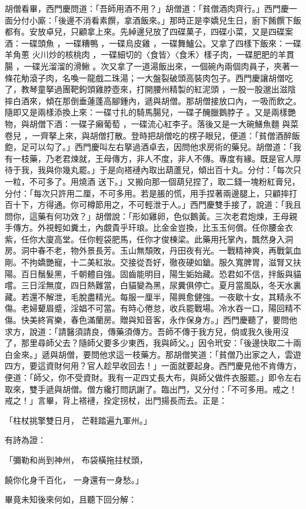\begin{showcontents}{}
胡僧看畢，西門慶問道：「吾師用酒不用？」胡僧道：「貧僧酒肉齊行。」西門慶一面分付小廝：「後邊不消看素饌，拿酒飯來。」那時正是李嬌兒生日，廚下餚饌下飯都有。安放卓兒，只顧拿上來。先綽邊兒放了四碟菓子，四碟小菜，又是四碟案酒：一碟頭魚 ，一碟糟鴨 ，一碟烏皮雞 ，一碟舞鱸公。又拿了四樣下飯來：一碟羊角蔥 火川炒的核桃肉 ，一碟細切的〈食皆〉〈食禾〉樣子肉，一碟肥肥的羊貫腸 ，一碟光溜溜的滑鰍 。次又拿了一道湯飯出來，一個碗內兩個肉員子，夾著一條花觔滾子肉，名喚一龍戲二珠湯；一大盤裂破頭高裝肉包子。西門慶讓胡僧吃了，教琴童拏過團靶鉤頭雞脖壺來，打開腰州精製的紅泥頭 ，一股一股邈出滋陰摔白酒來，傾在那倒垂蓮蓬高腳鍾內，遞與胡僧。那胡僧接放口內，一吸而飲之。隨即又是兩樣添換上來：一碟寸扎的騎馬腸兒，一碟子醃臘鵝脖子 。又是兩樣艷物，與胡僧下酒：一碟子癩葡萄 ，一碟流心紅李子。落後又是一大碗鱔魚麵 與菜卷兒 ，一齊拏上來，與胡僧打散。登時把胡僧吃的楞子眼兒，便道：「貧僧酒醉飯飽，足可以勾了。」西門慶叫左右拏過酒卓去，因問他求房術的藥兒。胡僧道：「我有一枝藥，乃老君煉就，王母傳方，非人不度，非人不傳。專度有緣。既是官人厚待于我，我與你幾丸罷。」于是向褡褳內取出葫蘆兒，傾出百十丸。分付：「每次只一粒，不可多了。用燒酒 送下。」又搬向那一個葫兒捏了，取二錢一塊粉紅膏兒，分付：「每次只許用二厘，不可多用。若是脹的慌，用手捏著兩邊腿上，只顧摔打百十下，方得通。你可樽節用之，不可輕泄于人。」西門慶雙手接了，說道：「我且問你，這藥有何功效？」胡僧說：「形如雞卵，色似鵝黃。三次老君炮煉，王母親手傳方。外視輕如糞土，內覷貴乎玕琅。比金金豈換，比玉玉何償。任你腰金衣紫，任你大廈高堂。任你輕袋肥馬，任你才俊棟梁。此藥用托掌內，飄然身入洞房。洞中春不老，物外景長芳。玉山無頹敗，丹田夜有光。一戰精神爽，再戰氣血剛。不拘嬌艷寵，十二美紅妝。交接從吾好，徹夜硬如鎗。服久寬脾胃，滋腎又扶陽。百日鬚髮黑，千朝體自強。固齒能明目，陽生姤始藏。恐君如不信，拌飯與貓嚐。三日淫無度，四日熱難當，白貓變為黑，尿糞俱停亡。夏月當風臥，冬天水裏藏。若還不解泄，毛脫盡精光。每服一厘半，陽興愈健強。一夜歇十女，其精永不傷。老婦顰眉蹙，淫娼不可當。有時心倦怠，收兵罷戰場。冷水吞一口，陽回精不傷。快美終宵樂，春色滿蘭房。贈與知音客，永作保身方。」西門慶聽了，要問他求方，說道：「請醫須請良，傳藥須傳方。吾師不傳于我方兒，倘或我久後用沒了，那里尋師父去？隨師父要多少東西，我與師父。」因令玳安：「後邊快取二十兩白金來。」遞與胡僧，要問他求這一枝藥方。那胡僧笑道：「貧僧乃出家之人，雲遊四方，要這資財何用？官人趁早收回去！」一面就要起身。西門慶見他不肯傳方，便道：「師父，你不受資財。我有一疋四丈長大布，與師父做件衣服罷。」即令左右取來，雙手遞與胡僧。僧方纔打問訊謝了。臨出門，又分付：「不可多用。戒之！戒之！」言畢，背上褡褳，拴定拐杖，出門揚長而去。正是：

「柱杖挑擎雙日月，  芒鞋踏遍九軍州。」

有詩為證：

「彌勒和尚到神州，  布袋橫拖拄杖頭，

饒你化身千百化，  一身還有一身愁。」

畢竟未知後來何如，且聽下回分解：




\end{showcontents}


